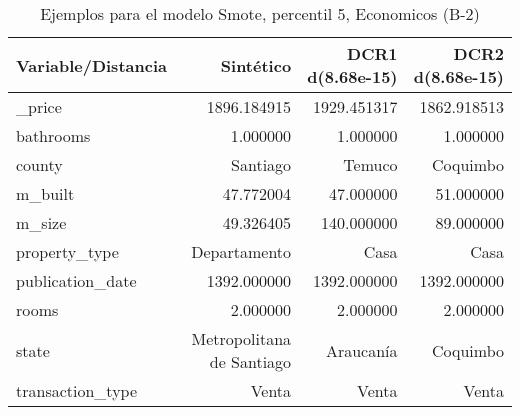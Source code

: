 \begin{table}[H]
\centering
\fontsize{10}{14}\selectfont
\caption{Ejemplos para el modelo Smote, percentil 5, Economicos (B-2)}
\label{table-example-economicos-b-2-smote-enc-5p}
\begin{tabular}{|l|r|r|r|}
\hline
\rowcolor[gray]{0.8}
Variable/Distancia & Sintético & DCR1 d(8.68e-15) & DCR2 d(8.68e-15) \\
\hline \_price & \cellcolor[rgb]{0.9, 0.54, 0.52} 1896.184915 & 1929.451317 & 1862.918513 \\
\hline bathrooms & \cellcolor[rgb]{0.9, 0.54, 0.52} 1.000000 & \cellcolor[rgb]{0.9, 0.54, 0.52} 1.000000 & \cellcolor[rgb]{0.9, 0.54, 0.52} 1.000000 \\
\hline county & \cellcolor[rgb]{0.9, 0.54, 0.52} Santiago & Temuco & Coquimbo \\
\hline m\_built & \cellcolor[rgb]{0.9, 0.54, 0.52} 47.772004 & 47.000000 & 51.000000 \\
\hline m\_size & \cellcolor[rgb]{0.9, 0.54, 0.52} 49.326405 & 140.000000 & 89.000000 \\
\hline property\_type & \cellcolor[rgb]{0.9, 0.54, 0.52} Departamento & Casa & Casa \\
\hline publication\_date & \cellcolor[rgb]{0.9, 0.54, 0.52} 1392.000000 & \cellcolor[rgb]{0.9, 0.54, 0.52} 1392.000000 & \cellcolor[rgb]{0.9, 0.54, 0.52} 1392.000000 \\
\hline rooms & \cellcolor[rgb]{0.9, 0.54, 0.52} 2.000000 & \cellcolor[rgb]{0.9, 0.54, 0.52} 2.000000 & \cellcolor[rgb]{0.9, 0.54, 0.52} 2.000000 \\
\hline state & \cellcolor[rgb]{0.9, 0.54, 0.52} Metropolitana de Santiago & Araucanía & Coquimbo \\
\hline transaction\_type & \cellcolor[rgb]{0.9, 0.54, 0.52} Venta & \cellcolor[rgb]{0.9, 0.54, 0.52} Venta & \cellcolor[rgb]{0.9, 0.54, 0.52} Venta \\
\hline
\end{tabular}
\end{table}
